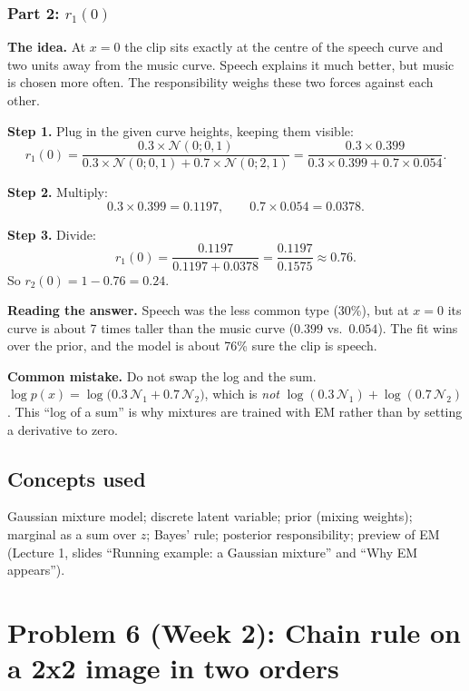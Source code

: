 \documentclass[12pt,a4paper]{article}
\begin{document}
\subsubsection{Part 2: $r_1(0)$}

\textbf{The idea.} At $x = 0$ the clip sits exactly at the centre of the speech curve and two units away from the music curve. Speech explains it much better, but music is chosen more often. The responsibility weighs these two forces against each other.

\textbf{Step 1.} Plug in the given curve heights, keeping them visible:
\[
r_1(0) = \frac{0.3 \times \mathcal{N}(0;0,1)}{0.3 \times \mathcal{N}(0;0,1) + 0.7 \times \mathcal{N}(0;2,1)} = \frac{0.3 \times 0.399}{0.3 \times 0.399 + 0.7 \times 0.054}.
\]

\textbf{Step 2.} Multiply:
\[
0.3 \times 0.399 = 0.1197, \qquad 0.7 \times 0.054 = 0.0378.
\]

\textbf{Step 3.} Divide:
\[
r_1(0) = \frac{0.1197}{0.1197 + 0.0378} = \frac{0.1197}{0.1575} \approx 0.76.
\]
So $r_2(0) = 1 - 0.76 = 0.24$.

\textbf{Reading the answer.} Speech was the less common type (30\%), but at $x = 0$ its curve is about 7 times taller than the music curve ($0.399$ vs.\ $0.054$). The fit wins over the prior, and the model is about 76\% sure the clip is speech.

\textbf{Common mistake.} Do not swap the log and the sum. $\log p(x) = \log\big(0.3\,\mathcal{N}_1 + 0.7\,\mathcal{N}_2\big)$, which is \emph{not} $\log(0.3\,\mathcal{N}_1) + \log(0.7\,\mathcal{N}_2)$. This ``log of a sum'' is why mixtures are trained with EM rather than by setting a derivative to zero.

\subsection{Concepts used}

Gaussian mixture model; discrete latent variable; prior (mixing weights); marginal as a sum over $z$; Bayes' rule; posterior responsibility; preview of EM (Lecture 1, slides ``Running example: a Gaussian mixture'' and ``Why EM appears'').

\newpage

\section{Problem 6 (Week 2): Chain rule on a 2x2 image in two orders}
\end{document}
